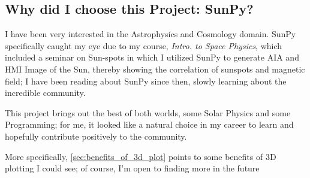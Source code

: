 \subsection{Why did I choose this Project: SunPy?}





    I have been very interested in the Astrophysics and Cosmology domain. 
    SunPy specifically caught my eye due to my course, \textit{Intro. to Space Physics}, which included a seminar on Sun-spots in which I utilized SunPy to generate AIA and HMI Image of the Sun, thereby showing the correlation of sunspots and magnetic field; I have been reading about SunPy since then, slowly learning about the incredible community.
    
    This project brings out the best of both worlds, some Solar Physics and some Programming; for me, it looked like a natural choice in my career to learn and hopefully contribute positively to the community.
    
    More specifically, \autoref{sec:benefits_of_3d_plot} points to some benefits of 3D plotting I could see; of course, I'm open to finding more in the future